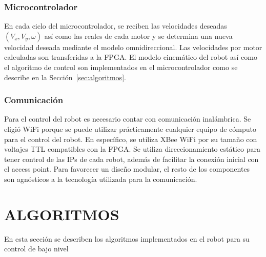 \documentclass[twocolumn,10pt]{amrob}
\begin{document}
\subsubsection*{Microcontrolador}
\label{sec:micro}
En cada ciclo del microcontrolador, se reciben las velocidades deseadas $(V_x,V_y,\omega)$ así como las reales de cada motor y se determina una nueva velocidad deseada mediante el modelo omnidireccional. Las velocidades por motor calculadas son transferidas a la FPGA. El modelo cinemático del robot así como el algoritmo de control son implementados en el microcontrolador como se describe en la Sección~\ref{sec:algoritmos}.

\subsubsection*{Comunicación}
\label{sec:comunicaciones}
Para el control del robot es necesario contar con comunicación inalámbrica. Se eligió WiFi porque se puede utilizar prácticamente cualquier equipo de cómputo para el control del robot. En específico, se utiliza XBee WiFi por su tamaño con voltajes TTL compatibles con la FPGA. Se utiliza direccionamiento estático para tener control de las IPs de cada robot, además de facilitar la conexión inicial con el access point. Para favorecer un diseño modular, el resto de los componentes son agnósticos a la tecnología utilizada para la comunicación. \par %


\section*{ALGORITMOS}
\label{sec:algoritmos}
En esta sección se describen los algoritmos implementados en el robot para su control de bajo nivel
\end{document}

